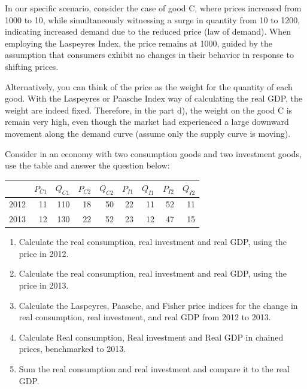 \documentclass[addpoints,ngerman,12pt,answers]{exam}
\begin{document}
\begin{questions}
\begin{solution}
\begin{enumerate}[label=(\alph*)]
				In our specific scenario, consider the case of good C, where prices increased from 1000 to 10, while simultaneously witnessing a surge in quantity from 10 to 1200, indicating increased demand due to the reduced price (law of demand). When employing the Laspeyres Index, the price remains  at 1000, guided by the assumption that consumers exhibit no changes in their behavior in response to shifting prices. 
				
				Alternatively, you can think of the price as the weight for the quantity of each good. With the Laspeyres or Paasche Index way of calculating the real GDP, the weight are indeed fixed. Therefore, in the part d), the weight on the good C is remain very high, even though the market had experienced a large downward movement along the demand curve (assume only the supply curve is moving).
			\end{enumerate}
		\end{solution}		
		\clearpage
		\question Consider in an economy with two consumption goods and two investment goods, use the table and answer the question below:
		\begin{table}[htbp]
			\centering
			\begin{tabular}{rrrrrrrrr}
				& \multicolumn{1}{l}{$P_{C1}$} & \multicolumn{1}{l}{$Q_{C1}$} & \multicolumn{1}{l}{$P_{C2}$} & \multicolumn{1}{l}{$Q_{C2}$} & \multicolumn{1}{l}{$P_{I1}$} & \multicolumn{1}{l}{$Q_{I1}$} & \multicolumn{1}{l}{$P_{I2}$} & \multicolumn{1}{l}{$Q_{I2}$} \\
				\midrule
				2012  & 11    & 110   & 18    & 50    & 22    & 11    & 52    & 11 \\
				2013  & 12    & 130   & 22    & 52    & 23    & 12    & 47    & 15 \\ \hline
			\end{tabular}%
		\end{table}%
		\begin{enumerate}[label=(\alph*)]
			\item Calculate the real consumption, real investment and real GDP, using the price in 2012.
			\item Calculate the real consumption, real investment and real GDP, using the price in 2013.
			\item Calculate the Laspeyres, Paasche, and Fisher price indices for the change in real consumption, real investment, and real GDP from 2012 to 2013.
			\item Calculate Real consumption, Real investment and Real GDP in chained prices, benchmarked to 2013.
			\item Sum the real consumption and real investment and compare it to the real GDP.
		\end{enumerate}
	\end{questions}
\end{document}
